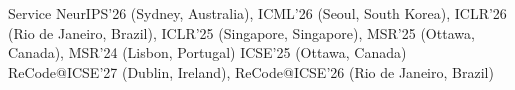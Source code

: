 \begin{rubric}{Service}
	NeurIPS'26 (Sydney, Australia), ICML'26 (Seoul, South Korea), ICLR'26 (Rio de Janeiro, Brazil), ICLR'25 (Singapore, Singapore), MSR'25 (Ottawa, Canada), MSR'24 (Lisbon, Portugal)
	ICSE'25 (Ottawa, Canada)
\entry*[Organizing]
	ReCode@ICSE'27 (Dublin, Ireland), ReCode@ICSE'26 (Rio de Janeiro, Brazil)
\end{rubric}